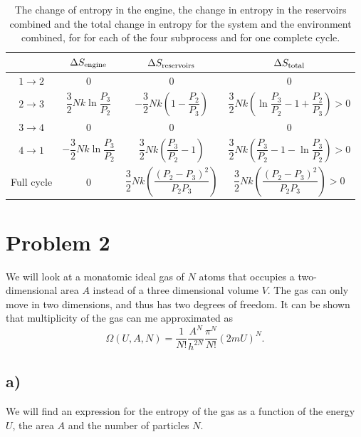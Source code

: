 \documentclass[a4paper, 11pt, titlepage, english]{article}
\begin{document}
\begin{table}[p]
\centering
\begin{tabular}{|c|c|c|c|}
\hline			& $\Delta S_{\rm engine}$ & $\Delta S_{\rm reservoirs}$ & $\Delta S_{\rm total}$ \\[0.2cm] \hline
$1\rightarrow2$	& 0 & 0 & 0 \\[0.2cm] \hline
$2\rightarrow3$	& $\dfrac{3}{2}Nk\ln\dfrac{P_3}{P_2}$ & $-\dfrac{3}{2}Nk\left(1 - \dfrac{P_2}{P_3}\right)$ & $\dfrac{3}{2}Nk\left(\ln\dfrac{P_3}{P_2} - 1 + \dfrac{P_2}{P_3}\right)>0$  \\[0.2cm] \hline
$3\rightarrow4$	& 0 & 0 & 0  \\[0.2cm] \hline
$4\rightarrow1$	& $-\dfrac{3}{2}Nk\ln\dfrac{P_3}{P_2}$ & $\dfrac{3}{2}Nk\left(\dfrac{P_3}{P_2}-1\right)$ & $\dfrac{3}{2}Nk\left(\dfrac{P_3}{P_2} - 1 - \ln\dfrac{P_3}{P_2}\right)>0$  \\[0.2cm] \hline\hline
Full cycle		& 0 & $\dfrac{3}{2}Nk\left(\dfrac{(P_2-P_3)^2}{P_2P_3}\right)$ &  $\dfrac{3}{2}Nk\left(\dfrac{(P_2-P_3)^2}{P_2P_3}\right) > 0$ \\[0.2cm] \hline
\end{tabular}
\caption{The change of entropy in the engine, the change in entropy in the reservoirs combined and the total change in entropy for the system and the environment combined, for for each of the four subprocess and for one complete cycle.} \label{tabel:delta_s}
\end{table}

\cleardoublepage

\section*{Problem 2}
We will look at a monatomic ideal gas of $N$ atoms that occupies a two-dimensional area $A$ instead of a three dimensional volume $V$. The gas can only move in two dimensions, and thus has two degrees of freedom. It can be shown that multiplicity of the gas can me approximated as
$$\Omega(U,A,N) = \frac{1}{N!}\frac{A^N}{h^{2N}}\frac{\pi^N}{N!}(2mU)^N.$$

\subsection*{a)}
We will find an expression for the entropy of the gas as a function of the energy $U$, the area $A$ and the number of particles $N$.
\end{document}
